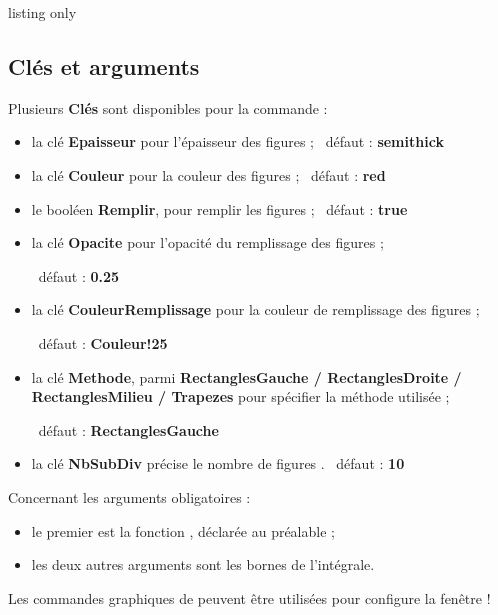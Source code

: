 \documentclass[a4paper,french,11pt]{article}
\newcommand\ctex[1]{\tcbox[vignettelatex]{#1}}
\newcommand\Cle[1]{{\bfseries\sffamily\textlangle \textcolor{orange!75!black}{#1}\textrangle}}
\begin{document}
\begin{PresCodeTexPL}{listing only}
\end{PresCodeTexPL}

\subsection{Clés et arguments}

\begin{cautionblock}
Plusieurs \Cle{Clés} sont disponibles pour la commande :

\begin{itemize}
	\item la clé \Cle{Epaisseur} pour l'épaisseur des \og figures \fg{} ; \hfill~défaut : \Cle{semithick}
	\item la clé \Cle{Couleur} pour la couleur des \og figures \fg{} ; \hfill~défaut : \Cle{red}
	\item le booléen \Cle{Remplir}, pour remplir les \og figures \fg{} ; \hfill~défaut : \Cle{true}
	\item la clé \Cle{Opacite} pour l'opacité du remplissage des \og figures \fg{} ;
	
	\hfill~défaut : \Cle{0.25}
	\item la clé \Cle{CouleurRemplissage} pour la couleur de remplissage des \og figures \fg{} ;
	
	\hfill~défaut : \Cle{Couleur!25}
	\item la clé \Cle{Methode}, parmi \Cle{RectanglesGauche / RectanglesDroite / RectanglesMilieu / Trapezes} pour spécifier la méthode utilisée ;
	
	\hfill~défaut : \Cle{RectanglesGauche}
	\item la clé \Cle{NbSubDiv} précise le nombre de \og figures \fg{}. \hfill~défaut : \Cle{10}
\end{itemize}

\smallskip

Concernant les arguments obligatoires :

\begin{itemize}
	\item le premier est la fonction , déclarée au préalable ;
	\item les deux autres arguments sont les bornes de l'intégrale.
\end{itemize}

Les commandes graphiques de \ctex{Proflycee} peuvent être utilisées pour configure la fenêtre !
\end{cautionblock}
\end{document}
